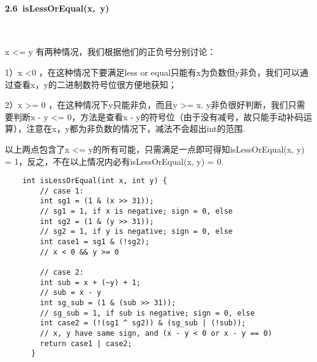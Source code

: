\documentclass[UTF8]{ctexart}
\begin{document}
\paragraph*{2.6\ isLessOrEqual(x,\ y)}\ \par
x \textless= y 有两种情况，我们根据他们的正负号分别讨论：\par
1）x \textless 0 ，在这种情况下要满足less or equal只能有x为负数但y非负，我们可以通过查看x，y的二进制数符号位很方便地获知；\par
2）x \textgreater= 0 ，在这种情况下y只能非负，而且y \textgreater= x. y非负很好判断，我们只需要判断x - y \textless= 0，方法是查看x - y的符号位（由于没有减号，故只能手动补码运算），注意在x，y都为非负数的情况下，减法不会超出int的范围.\par
以上两点包含了x \textless= y的所有可能，只需满足一点即可得知isLessOrEqual(x, y) = 1，反之，不在以上情况内必有isLessOrEqual(x, y) = 0.
\begin{lstlisting}
    int isLessOrEqual(int x, int y) {
        // case 1:
        int sg1 = (1 & (x >> 31));
        // sg1 = 1, if x is negative; sign = 0, else
        int sg2 = (1 & (y >> 31));
        // sg2 = 1, if y is negative; sign = 0, else
        int case1 = sg1 & (!sg2);
        // x < 0 && y >= 0
      
        // case 2:
        int sub = x + (~y) + 1;
        // sub = x - y
        int sg_sub = (1 & (sub >> 31));
        // sg_sub = 1, if sub is negative; sign = 0, else
        int case2 = (!(sg1 ^ sg2)) & (sg_sub | (!sub));
        // x, y have same sign, and (x - y < 0 or x - y == 0)
        return case1 | case2;
      }
\end{lstlisting}
\end{document}

